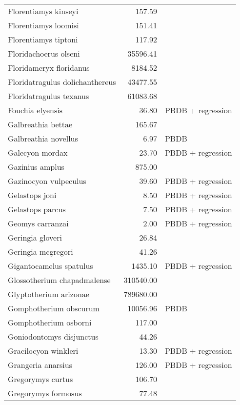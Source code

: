 \begin{table}[ht]
\begin{tabular}{lrl}
  Florentiamys kinseyi & 157.59 & \cite{Tomiya2013} \\ 
  Florentiamys loomisi & 151.41 & \cite{Tomiya2013} \\ 
  Florentiamys tiptoni & 117.92 & \cite{Tomiya2013} \\ 
  Floridachoerus olseni & 35596.41 & \cite{Tomiya2013} \\ 
  Floridameryx floridanus & 8184.52 & \cite{Tomiya2013} \\ 
  Floridatragulus dolichanthereus & 43477.55 & \cite{Tomiya2013} \\ 
  Floridatragulus texanus & 61083.68 & \cite{Tomiya2013} \\ 
  Fouchia elyensis & 36.80 & PBDB + regression \\ 
  Galbreathia bettae & 165.67 & \cite{Tomiya2013} \\ 
  Galbreathia novellus & 6.97 & PBDB \\ 
  Galecyon mordax & 23.70 & PBDB + regression \\ 
  Gazinius amplus & 875.00 & \cite{Soligo2006} \\ 
  Gazinocyon vulpeculus & 39.60 & PBDB + regression \\ 
  Gelastops joni & 8.50 & PBDB + regression \\ 
  Gelastops parcus & 7.50 & PBDB + regression \\ 
  Geomys carranzai & 2.00 & PBDB + regression \\ 
  Geringia gloveri & 26.84 & \cite{Tomiya2013} \\ 
  Geringia mcgregori & 41.26 & \cite{Tomiya2013} \\ 
  Gigantocamelus spatulus & 1435.10 & PBDB + regression \\ 
  Glossotherium chapadmalense & 310540.00 & \cite{McDonald1995} \\ 
  Glyptotherium arizonae & 789680.00 & \cite{McDonald1995} \\ 
  Gomphotherium obscurum & 10056.96 & PBDB \\ 
  Gomphotherium osborni & 117.00 & \cite{Wang2014} \\ 
  Goniodontomys disjunctus & 44.26 & \cite{Tomiya2013} \\ 
  Gracilocyon winkleri & 13.30 & PBDB + regression \\ 
  Grangeria anarsius & 126.00 & PBDB + regression \\ 
  Gregorymys curtus & 106.70 & \cite{Tomiya2013} \\ 
  Gregorymys formosus & 77.48 & \cite{Tomiya2013} \\ 

\end{tabular}
\end{table}
